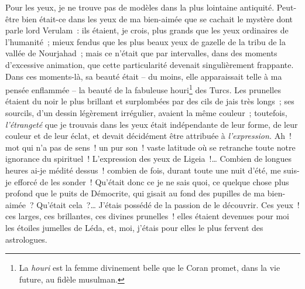 \documentclass[french,twoside]{book} %
\begin{document}
Pour les yeux, je ne trouve pas de modèles dans la plus lointaine antiquité. Peut-être bien était-ce dans les yeux de ma bien-aimée que se cachait le mystère dont parle lord Verulam : ils étaient, je crois, plus grands que les yeux ordinaires de l’humanité ; mieux fendus que les plus beaux yeux de gazelle de la tribu de la vallée de Nourjahad ; mais ce n’était que par intervalles, dans des moments d’excessive animation, que cette particularité devenait singulièrement frappante. Dans ces moments-là, sa beauté était – du moins, elle apparaissait telle à ma pensée enflammée – la beauté de la fabuleuse houri\footnote{La \emph{houri} est la femme divinement belle que le Coran promet, dans la vie future, au fidèle musulman.} des Turcs. Les prunelles étaient du noir le plus brillant et surplombées par des cils de jais très longs ; ses sourcils, d’un dessin légèrement irrégulier, avaient la même couleur ; toutefois, \emph{l’étrangeté} que je trouvais dans les yeux était indépendante de leur forme, de leur couleur et de leur éclat, et devait décidément être attribuée à \emph{l’expression.} Ah ! mot qui n’a pas de sens ! un pur son ! vaste latitude où se retranche toute notre ignorance du spirituel ! L’expression des yeux de Ligeia !… Combien de longues heures ai-je médité dessus ! combien de fois, durant toute une nuit d’été, me suis-je efforcé de les sonder ! Qu’était donc ce je ne sais quoi, ce quelque chose plus profond que le puits de Démocrite, qui gisait au fond des pupilles de ma bien-aimée ? Qu’était cela ?… J’étais possédé de la passion de le découvrir. Ces yeux ! ces larges, ces brillantes, ces divines prunelles ! elles étaient devenues pour moi les étoiles jumelles de Léda, et, moi, j’étais pour elles le plus fervent des astrologues.\par
\end{document}
